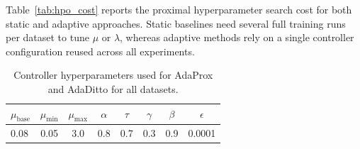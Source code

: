 \documentclass[letterpaper]{article} %
\begin{document}
Table~\ref{tab:hpo_cost} reports the proximal hyperparameter search
cost for both static and adaptive approaches. Static baselines need
several full training runs per dataset to tune $\mu$ or $\lambda$,
whereas adaptive methods rely on a single controller configuration
reused across all experiments.

\begin{table}[tb]
\centering
\begin{tabular}{lccccccc}
\toprule
$\mu_{\text{base}}$ & $\mu_{\min}$ & $\mu_{\max}$ & $\alpha$ & $\tau$
  & $\gamma$ & $\beta$ & $\epsilon$\\
\midrule
0.08 & 0.05 & 3.0 & 0.8 & 0.7 & 0.3 & 0.9 & 0.0001\\
\bottomrule
\end{tabular}
\caption{Controller hyperparameters used for AdaProx and AdaDitto for
  all datasets.}
\label{tab:controller-hparams}
\end{table}
\end{document}
